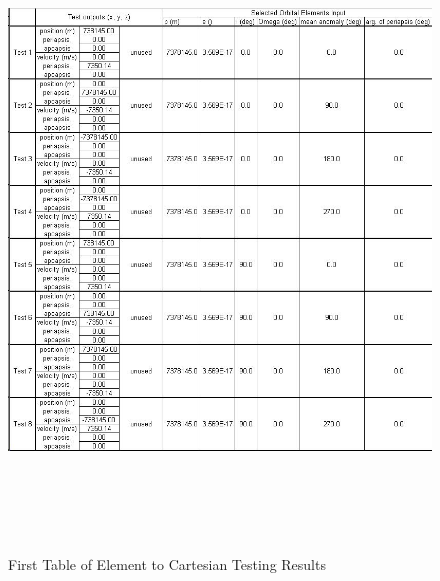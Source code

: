 \begin{description}
\begin{figure}[h]
\begin{center}
\includegraphics[height=170mm]{JPGfiles/orb_deconvert.jpg}
\caption{First Table of Element to Cartesian Testing Results}
\label{ele_to_car1}
\end{center}
\end{figure}


\end{description}
